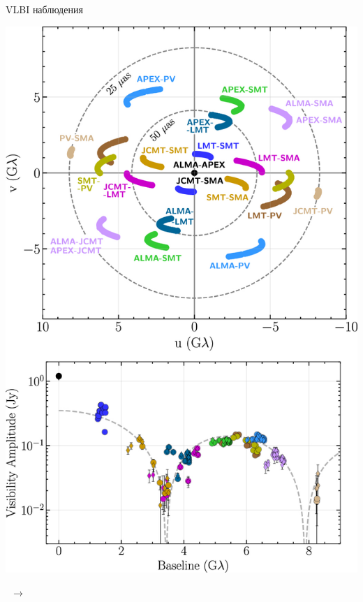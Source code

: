 \documentclass[hyperref={colorlinks,citecolor=blue,linkcolor=blue,urlcolor=blue}]{beamer}
\begin{document}
	\begin{frame}{VLBI наблюдения}

		\centering
		\qquad
		\begin{minipage}{11em}
			\includegraphics[scale = 0.5]{Pre-Defence/UV_coverage.jpg}
		\end{minipage}\,\,\,\huge$\rightarrow$
		\begin{minipage}{8em}

\end{minipage}
\end{frame}
\end{document}
